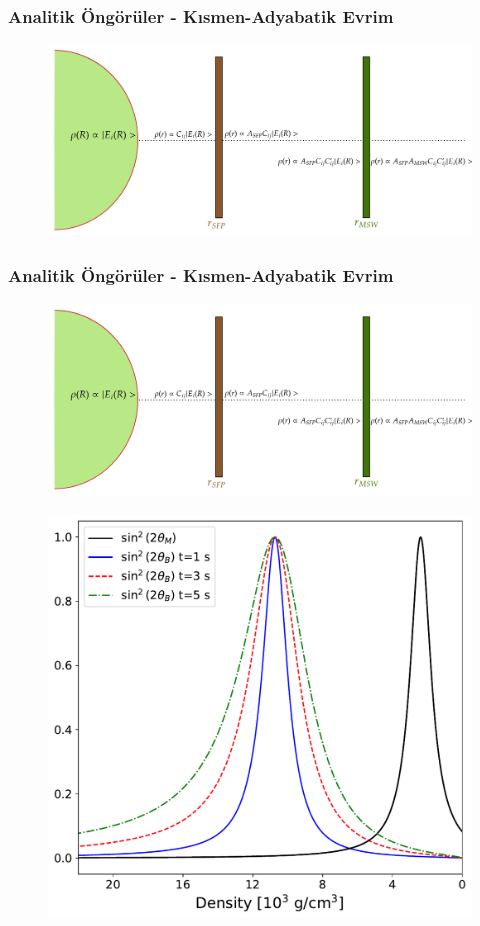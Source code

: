 \documentclass[10pt]{beamer}
\begin{document}
\begin{frame}
    \frametitle{Analitik Öngörüler - Kısmen-Adyabatik Evrim}
    \begin{figure}[hbt!]
        \centering
        \includegraphics[width=\textwidth]{fig/rhoSFPMSW.png}
    \end{figure}
\end{frame}

\begin{frame}
    \frametitle{Analitik Öngörüler - Kısmen-Adyabatik Evrim}
    \begin{figure}[hbt!]
        \centering
        \includegraphics[width=.65\textwidth]{fig/rhoSFPMSW.png}
    \end{figure}
    \begin{figure}[hbt!]
        \centering
        \includegraphics[width=.4\textwidth]{fig/3.pdf}
    \end{figure}
\end{frame}
\end{document}
